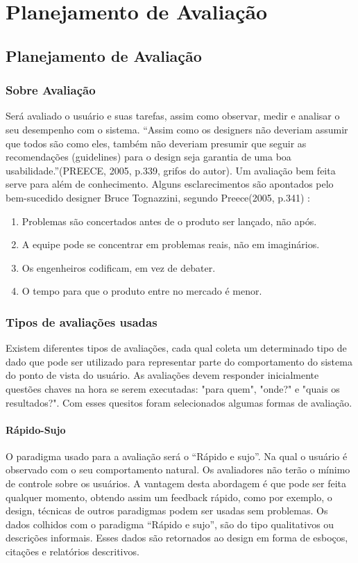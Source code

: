 \part[Planejamento de Avaliação]{Planejamento de Avaliação}
\chapter[Planejamento de Avaliação]{Planejamento de Avaliação}

\section{Sobre Avaliação}

	Será avaliado o usuário e suas tarefas, assim como observar, medir e analisar o seu desempenho com o sistema. 
	“Assim como os designers não deveriam assumir que todos são como eles, também não deveriam presumir que seguir as recomendações (guidelines) para o design seja garantia de uma boa usabilidade.”(PREECE, 2005, p.339, grifos do autor).
	Um avaliação bem feita serve para além de conhecimento. Alguns esclarecimentos são apontados pelo bem-sucedido designer Bruce Tognazzini, segundo Preece(2005, p.341) \nocite{jeniffer05}:

\begin{enumerate}
	\item Problemas são concertados antes de o produto ser lançado, não após.
	\item A equipe pode se concentrar em problemas reais, não em imaginários.
	\item Os engenheiros codificam, em vez de debater.
	\item O tempo para que o produto entre no mercado é menor.
\end{enumerate}

\section{Tipos de avaliações usadas}

Existem diferentes tipos de avaliações, cada qual coleta um determinado tipo de dado que pode ser utilizado para representar parte do comportamento do sistema do ponto de vista do usuário. As avaliações devem responder inicialmente questões chaves na hora se serem executadas: "para quem", "onde?" e "quais os resultados?". Com esses quesitos foram selecionados algumas formas de avaliação.

\subsection{Rápido-Sujo}
O paradigma usado para a avaliação será o “Rápido	 e sujo”. Na qual o usuário é observado com o seu comportamento natural.
Os avaliadores não terão o mínimo de controle sobre os usuários. A vantagem desta abordagem é que pode ser feita qualquer momento, obtendo assim um feedback rápido, como por exemplo, o design, técnicas de outros paradigmas podem ser usadas sem problemas.
Os dados colhidos com o paradigma “Rápido e sujo”, são do tipo qualitativos ou descrições informais. Esses dados são retornados ao design em forma de esboços, citações e relatórios descritivos.

